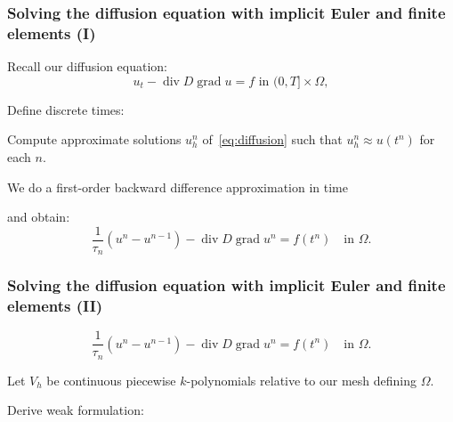 \documentclass[mathserif, aspectratio=169]{beamer}
\DeclareMathOperator{\Div}{\mathrm{div}}
\DeclareMathOperator{\Grad}{\mathrm{grad}}
\begin{document}
\begin{frame}
\frametitle{Solving the diffusion equation with implicit Euler and finite elements (I)}

Recall our diffusion equation:
\begin{equation*}
  u_t - \Div D \Grad u = f \text{ in } (0, T] \times \Omega, 
\end{equation*}

Define discrete times: 


\bigskip
\bigskip

Compute approximate solutions $u^n_h$ of~\eqref{eq:diffusion} such
that $u^n_h \approx u(t^n)$ for each $n$.

\medskip
We do a first-order backward difference approximation in time

\bigskip
\bigskip

and obtain:
\begin{equation}
  \label{eq:chp3:time-discrete}
  \frac{1}{\tau_n} (u^n - u^{n-1}) - \Div D \Grad u^n = f(t^n) \quad \text{in } \Omega. 
\end{equation}

\end{frame}


\begin{frame}
  \frametitle{Solving the diffusion equation with implicit Euler and finite elements (II)}

  \begin{equation*}
    \frac{1}{\tau_n} (u^n - u^{n-1}) - \Div D \Grad u^n = f(t^n) \quad \text{in } \Omega. 
  \end{equation*}

  Let $V_h$ be continuous piecewise $k$-polynomials relative to
  our mesh defining $\Omega$.

  \bigskip
  Derive weak formulation: 
  \vspace{10em}
  
\end{frame}
\end{document}
